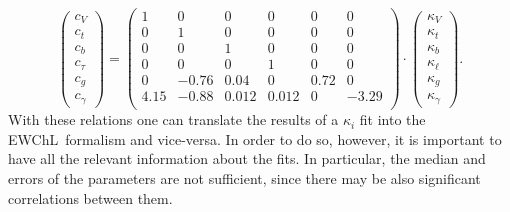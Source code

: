 \begin{equation}
  \label{eq:kappa.EFT.7}
  \begin{pmatrix}
    c_{V}\\
    c_{t}\\
    c_{b}\\
    c_{\tau}\\
    c_{g}\\
    c_{\gamma}
  \end{pmatrix}
  = 
  \begin{pmatrix}
    1 & 0 & 0 & 0 & 0 & 0 \\
    0 & 1 & 0 & 0 & 0 & 0 \\
    0 & 0 & 1 & 0 & 0 & 0 \\
    0 & 0 & 0 & 1 & 0 & 0 \\
    0 & -0.76 & 0.04 & 0 & 0.72 & 0 \\
    4.15 & -0.88 & 0.012 & 0.012 & 0 & -3.29 \\
  \end{pmatrix}
  \cdot
  \begin{pmatrix}
    \kappa_{V}\\
    \kappa_{t}\\
    \kappa_{b}\\
    \kappa_{\ell}\\
    \kappa_{g}\\
    \kappa_{\gamma}
  \end{pmatrix}.
\end{equation}
%
With these relations one can translate the results of a $\kappa_i$ fit into the EWChL~formalism and vice-versa. 
In order to do so, however, it is important to have all the relevant information about the fits. In particular,
the median and errors of the parameters are not sufficient, since there may be also significant correlations between them.\\ 
\\
